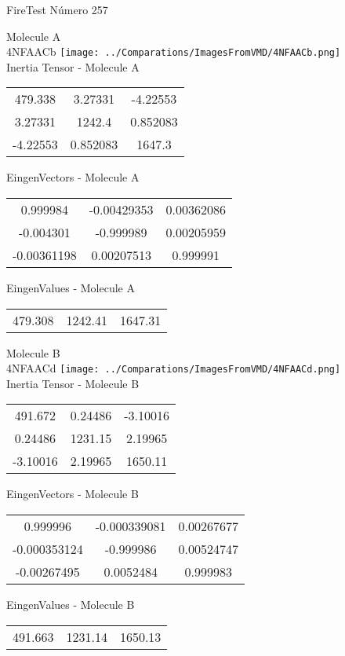 \vtab[-2cm]
\begin{center}
{\large FireTest \tab Número 257}
\end{center}
\begin{multicols}{2}
\begin{center}

Molecule A \\ 
4NFAACb
\texttt{[image: ../Comparations/ImagesFromVMD/4NFAACb.png]}
\\
Inertia Tensor - Molecule A \\
\vtab

\begin{tabular}{|c c c|}
479.338	 & 	3.27331	 & 	-4.22553	 \\
3.27331	 & 	1242.4	 & 	0.852083	 \\
-4.22553	 & 	0.852083	 & 	1647.3
\end{tabular}

\vtab
 EingenVectors - Molecule A     \\
\vtab
\begin{tabular}{|c c c|}
0.999984	 & 	-0.00429353	 & 	0.00362086	 \\
-0.004301	 & 	-0.999989	 & 	0.00205959	 \\
-0.00361198	 & 	0.00207513	 & 	0.999991
\end{tabular}

\vtab
 EingenValues - Molecule A     \\
\vtab
\begin{tabular}{|c c c|}
479.308	 & 	1242.41	 & 	1647.31	 \\
\end{tabular}
\columnbreak

Molecule B \\ 
4NFAACd
\texttt{[image: ../Comparations/ImagesFromVMD/4NFAACd.png]}
\\
Inertia Tensor - Molecule B \\
\vtab

\begin{tabular}{|c c c|}
491.672	 & 	0.24486	 & 	-3.10016	 \\
0.24486	 & 	1231.15	 & 	2.19965	 \\
-3.10016	 & 	2.19965	 & 	1650.11
\end{tabular}

\vtab
 EingenVectors - Molecule B     \\
\vtab
\begin{tabular}{|c c c|}
0.999996	 & 	-0.000339081	 & 	0.00267677	 \\
-0.000353124	 & 	-0.999986	 & 	0.00524747	 \\
-0.00267495	 & 	0.0052484	 & 	0.999983
\end{tabular}

\vtab
 EingenValues - Molecule B     \\
\vtab
\begin{tabular}{|c c c|}
491.663	 & 	1231.14	 & 	1650.13	 \\
\end{tabular}

\end{center}
\end{multicols}
